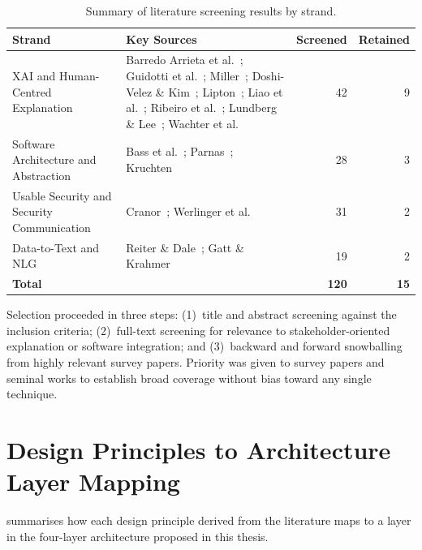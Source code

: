 \begin{table}[h]
\centering
\begin{tabular}{@{}lp{}rr@{}}
\toprule
\textbf{Strand} & \textbf{Key Sources} & \textbf{Screened} & \textbf{Retained} \\
\midrule
XAI and Human-Centred Explanation
  & Barredo Arrieta et al.~\cite{barredo2020xai}; Guidotti et al.~\cite{guidotti2018survey}; Miller~\cite{miller2019explanation}; Doshi-Velez \& Kim~\cite{doshivelez2017rigorous}; Lipton~\cite{lipton2018mythos}; Liao et al.~\cite{liao2020questioning}; Ribeiro et al.~\cite{ribeiro2016should}; Lundberg \& Lee~\cite{lundberg2017unified}; Wachter et al.~\cite{wachter2017counterfactual}
  & 42 & 9 \\
\midrule
Software Architecture and Abstraction
  & Bass et al.~\cite{bass2012software}; Parnas~\cite{parnas1972modules}; Kruchten~\cite{kruchten1995viewmodel}
  & 28 & 3 \\
\midrule
Usable Security and Security Communication
  & Cranor~\cite{cranor2008framework}; Werlinger et al.~\cite{werlinger2008ids}
  & 31 & 2 \\
\midrule
Data-to-Text and NLG
  & Reiter \& Dale~\cite{reiter2000nlg}; Gatt \& Krahmer~\cite{gatt2018survey}
  & 19 & 2 \\
\midrule
\textbf{Total} & & \textbf{120} & \textbf{15} \\
\bottomrule
\end{tabular}
\caption{Summary of literature screening results by strand.}
\label{tab:screening-results}
\end{table}

Selection proceeded in three steps: (1)~title and abstract screening against the inclusion criteria; (2)~full-text screening for relevance to stakeholder-oriented explanation or software integration; and (3)~backward and forward snowballing from highly relevant survey papers. Priority was given to survey papers and seminal works to establish broad coverage without bias toward any single technique.

\section{Design Principles to Architecture Layer Mapping}
\label{sec:dp-mapping}

 summarises how each design principle derived from the literature maps to a layer in the four-layer architecture proposed in this thesis.

